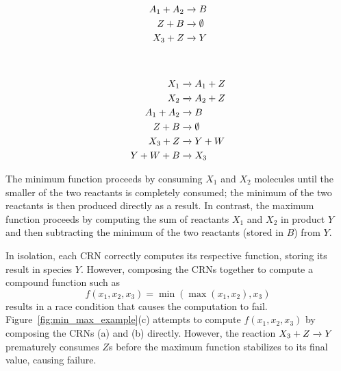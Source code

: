\begin{figure*}[t!]
\begin{subfigure}[t]{0.23\textwidth}
\begin{minipage}[t][1.5in][b]{0.23\textwidth}
\begin{align*}
                A_1 + A_2 &\xrightarrow{} B\\
                Z + B &\xrightarrow{} \emptyset\\
                X_3 + Z &\xrightarrow{} Y
            \end{align*}
            \vspace*{\fill}
        \end{minipage}
        \vspace*{-1.5em}
        \caption{}
    \end{subfigure}
    ~
    \begin{subfigure}[t]{0.23\textwidth}
        \centering
        \begin{minipage}[t][1.5in][b]{0.23\textwidth}
            \vspace*{\fill}
            \begin{align*}
                X_1 &\xrightarrow{} A_1 + Z\\
                X_2 &\xrightarrow{} A_2 + Z\\
                A_1 + A_2 &\xrightarrow{} B\\
                Z + B &\xrightarrow{} \emptyset\\
                X_3 + Z &\xrightarrow{} Y + W\\
                Y + W + B &\xrightarrow{} X_3
            \end{align*}
            \vspace*{\fill}
        \end{minipage}
        \vspace*{-1.5em}
        \caption{}
    \end{subfigure}
    \caption{\label{fig:min_max_example}
        (a) Computes \( y = \min(x_1, x_2) \), (b) computes \( y = \max(x_1,x_2) \), (c) attempts to compute \( y = f(x_1, x_2, x_2) \) but fails, (d) correctly computes \( y = f(x_1, x_2, x_3) \).
    }
\end{figure*}
The minimum function proceeds by consuming \( X_1 \) and \( X_2 \) molecules until the smaller of the two reactants is completely consumed; the minimum of the two reactants is then produced directly as a result.
In contrast, the maximum function proceeds by computing the sum of reactants $X_1$ and $X_2$ in product $Y$ and then subtracting the minimum of the two reactants (stored in $B$) from $Y$.

In isolation, each CRN correctly computes its respective function, storing its result in species \( Y \).
However, composing the CRNs together to compute a compound function such as
\begin{equation}\label{eq:min_max_function}
    f(x_1, x_2, x_3) = \min(\max(x_1, x_2), x_3)
\end{equation}
results in a race condition that causes the computation to fail.
Figure~\ref{fig:min_max_example}(c) attempts to compute \( f(x_1, x_2, x_3) \) by composing the CRNs (a) and (b) directly.
However, the reaction \( X_3 + Z \xrightarrow{} Y \) prematurely consumes \( Z \)s before the maximum function stabilizes to its final value, causing failure.

